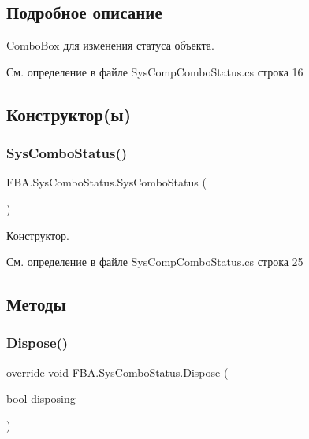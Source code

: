 \subsection{Подробное описание}
Combo\+Box для изменения статуса объекта. 

См. определение в файле Sys\+Comp\+Combo\+Status.\+cs строка 16



\subsection{Конструктор(ы)}
\mbox{\label{class_f_b_a_1_1_sys_combo_status_a9360d1bb409e63f9920a4864eef625cb}} 
\subsubsection{\texorpdfstring{Sys\+Combo\+Status()}{SysComboStatus()}}
{\footnotesize\ttfamily F\+B\+A.\+Sys\+Combo\+Status.\+Sys\+Combo\+Status (\begin{DoxyParamCaption}{ }\end{DoxyParamCaption})}



Конструктор. 



См. определение в файле Sys\+Comp\+Combo\+Status.\+cs строка 25



\subsection{Методы}
\mbox{\label{class_f_b_a_1_1_sys_combo_status_a5b76093674ed209513697216ec9675db}} 
\subsubsection{\texorpdfstring{Dispose()}{Dispose()}}
{\footnotesize\ttfamily override void F\+B\+A.\+Sys\+Combo\+Status.\+Dispose (\begin{DoxyParamCaption}\item[{bool}]{disposing }\end{DoxyParamCaption})\hspace{0.3cm}{\ttfamily [protected]}}



